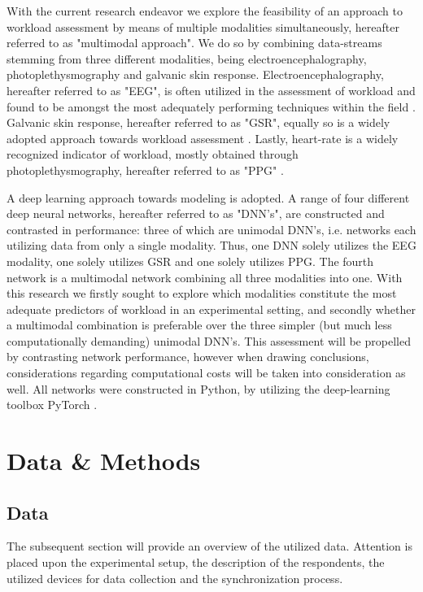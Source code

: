 \documentclass[12pt]{article}
\begin{document}
With the current research endeavor we explore the feasibility of an approach to workload assessment by means of multiple modalities simultaneously, hereafter referred to as "multimodal approach". We do so by combining data-streams stemming from three different modalities, being electroencephalography, photoplethysmography and galvanic skin response. Electroencephalography,  hereafter referred to as "EEG", is often utilized in the assessment of workload \cite{craik2019deep} \cite{berka2005evaluation} and found to be amongst the most adequately performing techniques within the field \cite{hogervorst2014combining}. Galvanic skin response, hereafter referred to as "GSR", equally so is a widely adopted approach towards workload assessment \cite{nourbakhsh2012using} \cite{zhou2015dynamic}. Lastly, heart-rate is a widely recognized indicator of workload, mostly obtained through photoplethysmography, hereafter referred to as "PPG" \cite{zhang2018evaluating} \cite{jimenez2018using}. 

A deep learning approach towards modeling is adopted. A range of four different deep neural networks, hereafter referred to as "DNN's", are constructed and contrasted in performance: three of which are unimodal DNN's, i.e. networks each utilizing data from only a single modality. Thus,  one DNN solely utilizes the EEG modality,  one solely utilizes GSR and one solely utilizes PPG. The fourth network is a multimodal network combining all three modalities into one. With this research we firstly sought to explore which modalities constitute the most adequate predictors of workload in an experimental setting, and secondly whether a multimodal combination is preferable over the three simpler (but much less computationally demanding) unimodal DNN's. This assessment will be propelled by contrasting network performance, however when drawing conclusions, considerations regarding computational costs will be taken into consideration as well. All networks were constructed in Python, by utilizing the deep-learning toolbox PyTorch \cite{paszke2017automatic}. 


\newpage
\section{Data \& Methods}

\subsection{Data}
The subsequent section will provide an overview of the utilized data. Attention is placed upon the experimental setup, the description of the respondents, the utilized devices for data collection and the synchronization process. 
\end{document}
